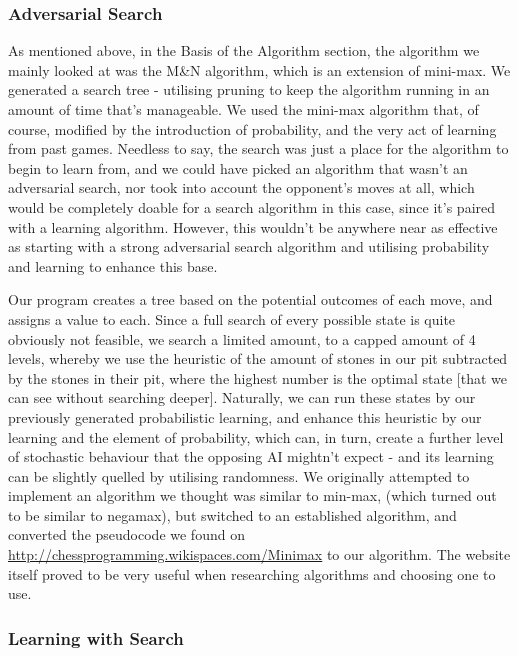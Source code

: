 \documentclass[11pt]{article}
\begin{document}
\subsubsection{Adversarial Search}
\label{sec-3-2-2}

As mentioned above, in the Basis of the Algorithm section, the algorithm we mainly looked at was the M\&N algorithm, which is an extension of mini-max. We generated a search tree - utilising pruning to keep the algorithm running in an amount of time that's manageable. We used the mini-max algorithm that, of course, modified by the introduction of probability, and the very act of learning from past games. Needless to say, the search was just a place for the algorithm to begin to learn from, and we could have picked an algorithm that wasn't an adversarial search, nor took into account the opponent's moves at all, which would be completely doable for a search algorithm in this case, since it's paired with a learning algorithm. However, this wouldn't be anywhere near as effective as starting with a strong adversarial search algorithm and utilising probability and learning to enhance this base.

Our program creates a tree based on the potential outcomes of each move, and assigns a value to each. Since a full search of every possible state is quite obviously not feasible, we search a limited amount, to a capped amount of 4 levels, whereby we use the heuristic of the amount of stones in our pit subtracted by the stones in their pit, where the highest number is the optimal state [that we can see without searching deeper]. Naturally, we can run these states by our previously generated probabilistic learning, and enhance this heuristic by our learning and the element of probability, which can, in turn, create a further level of stochastic behaviour that the opposing AI mightn't expect - and its learning can be slightly quelled by utilising randomness. We originally attempted to implement an algorithm we thought was similar to min-max, (which turned out to be similar to negamax), but switched to an established algorithm, and converted the pseudocode we found on \url{http://chessprogramming.wikispaces.com/Minimax} to our algorithm. The website itself proved to be very useful when researching algorithms and choosing one to use.
\subsubsection{Learning with Search}
\label{sec-3-2-3}
\end{document}
